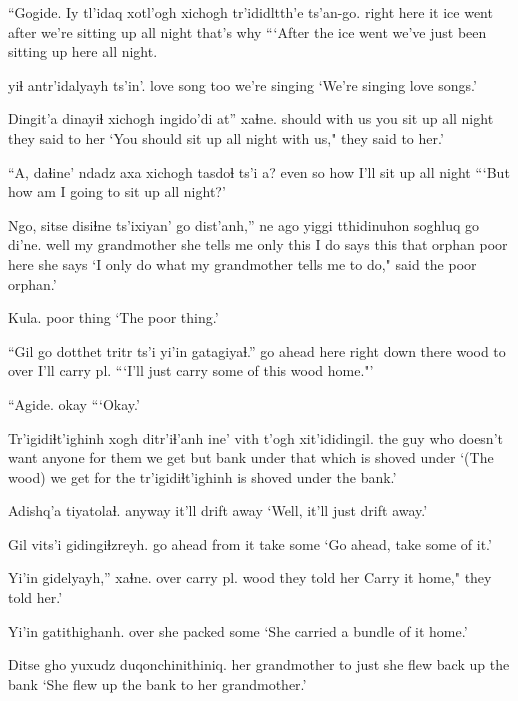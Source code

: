 \documentclass[12pt]{article}
\begin{document}
\gll ``Gogide.   Iy tl'idaq  xotl'ogh {xichogh tr'ididltth'e}      ts'an-go.
{right here} it {ice went} after {we're sitting up all night} {that's why}
\glt ```After the ice went we've just been sitting up here all night.
\glend

 yiɬ antr'idalyayh ts'in'.
{love song}      too {we're singing}
\glt `We're singing love songs.'
\glend

\gll Dingit'a dinayiɬ    {xichogh ingido'di}   at'' xaɬne.
should {with us} {you sit up all night}  {} {they said to her}
\glt `You should sit up all night with us," they said to her.'
\glend

\gll ``A, daɬine' {ndadz axa} {xichogh tasdoɬ}  ts'i a?
{} {even so} how       {I'll sit up all night}
\glt ```But how am I going to sit up all night?'
\glend

\gll Ngo, sitse            disiɬne        ts'ixiyan' go   dist'anh,'' ne   ago  yiggi tthidinuhon soghluq go  di'ne.
well {my grandmother} {she tells me} only       this {I do} says this that  orphan      poor    here {she says}
\glt `I only do what my grandmother tells me to do," said the poor orphan.'
\glend

\gll Kula.
{{poor thing}}
\glt `The poor thing.'
\glend

\gll ``Gil go   dotthet    tritr ts'i yi'in gatagiyaɬ.''
{go ahead} here {right down there} wood to over  {I'll carry pl.}
\glt ```I'll just carry some of this wood home."'
\glend

\gll ``Agide.
{okay}
\glt ```Okay.'
\glend

\gll Tr'igidiɬt'ighinh                  xogh    ditr'iɬ'anh ine' vith t'ogh xit'ididingil.
{the guy who doesn't want anyone} {for them} {we get} but bank under {that which is shoved under}
\glt `(The wood) we get for the tr'igidiɬt'ighinh is shoved under the bank.'
\glend

\gll Adishq'a tiyatolaɬ.
anyway     {it'll drift away}
\glt `Well, it'll just drift away.'
\glend

\gll Gil      vits'i gidingiɬzreyh. 
{go ahead} {from it} {take some}    
\glt `Go ahead, take some of it.'
\glend

\gll Yi'in gidelyayh,'' xaɬne. 
over  {carry pl. wood}  {they told her}
\glt  Carry it home," they told her.'
\glend

\gll Yi'in gatithighanh.
over  {she packed some}
\glt `She carried a bundle of it home.'
\glend

\gll Ditse           gho yuxudz   duqonchinithiniq.
{her grandmother} to  just  {she flew back up the bank}
\glt `She flew up the bank to her grandmother.'
\glend
\end{document}
